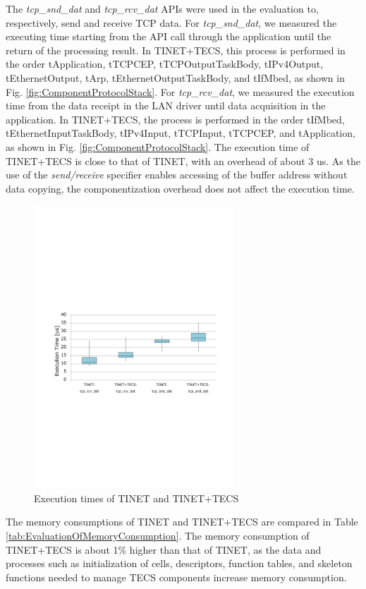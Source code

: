 \documentclass[JIP]{ipsj_v2/UTF8/ipsj}
\begin{document}
The {\it tcp\_snd\_dat} and {\it tcp\_rcv\_dat} APIs were used in the evaluation to, respectively, send and receive TCP data.
For {\it tcp\_snd\_dat}, we measured the executing time starting from the API call through the application until the return of the processing result.
In TINET+TECS, this process is performed in the order tApplication, tTCPCEP, tTCPOutputTaskBody, tIPv4Output, tEthernetOutput, tArp, tEthernetOutputTaskBody, and tIfMbed, as shown in Fig. \ref{fig:ComponentProtocolStack}.
For {\it tcp\_rcv\_dat}, we measured the execution time from the data receipt in the LAN driver until data acquisition in the application.
In TINET+TECS, the process is performed in the order tIfMbed, tEthernetInputTaskBody, tIPv4Input, tTCPInput, tTCPCEP, and tApplication, as shown in Fig. \ref{fig:ComponentProtocolStack}.
The execution time of TINET+TECS is close to that of TINET, with an overhead of about 3 us.
As the use of the {\it send/receive} specifier enables accessing of the buffer address without data copying, the componentization overhead does not affect the execution time.

\begin{figure}[t]
    \centering
    \includegraphics[width=7.5cm,clip]{figure/EvaluationOfExecutionTime.pdf}
    \caption{Execution times of TINET and TINET+TECS}
    \label{fig:EvaluationOfExecutionTime}
\end{figure}

The memory consumptions of TINET and TINET+TECS are compared in Table \ref{tab:EvaluationOfMemoryConsumption}.
The memory consumption of TINET+TECS is about 1\% higher than that of TINET, as the data and processes such as initialization of cells, descriptors, function tables, and skeleton functions needed to manage TECS components increase memory consumption.
\end{document}
